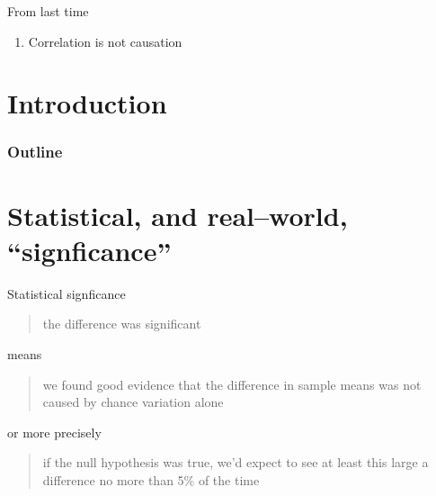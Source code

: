 

\subtitle{and hypothesis testing principles}

\date{22 October 2013}




\begin{frame}
  \maketitle
\end{frame}




\begin{frame}{From last time} 
  \begin{enumerate}
  \item Correlation is not causation
  \end{enumerate}
\end{frame}

\section*{Introduction}
\begin{frame}\frametitle<presentation>{Outline}
  \tableofcontents
\end{frame}


\section{Statistical, and real--world, ``signficance''}

\begin{frame}{Statistical signficance}

    \begin{quote}
        the difference was  significant 
    \end{quote}

    means
    \begin{quote}
        we found good evidence that the difference in sample means was not caused by chance variation alone
    \end{quote}

    or more precisely
    \begin{quote}
        if the null hypothesis was true, we'd expect to see at least this large a difference no more than 5\% of the time
    \end{quote}

\end{frame}

